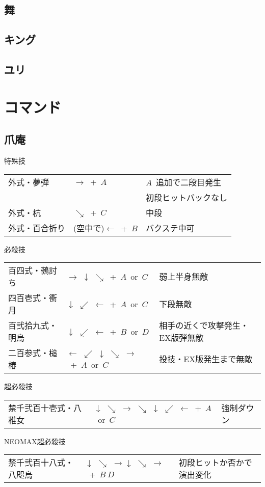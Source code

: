 \documentclass[a4j,11pt]{jarticle}
\def\hado{$\downarrow$ $\searrow$ $\rightarrow$}%
\def\tatsu{$\downarrow$ $\swarrow$ $\leftarrow$}%
\def\syoryu{$\rightarrow$ $\downarrow$ $\searrow$}%
\def\yoga{$\leftarrow$ $\swarrow$ $\downarrow$ $\searrow$ $\rightarrow$}%
\def\ryuko{$\downarrow$ $\searrow$ $\rightarrow$ $\searrow$ $\downarrow$ $\swarrow$ $\leftarrow$}%
\begin{document}
\subsection{舞}
\subsection{キング}
\subsection{ユリ}
\newpage
\section{コマンド}
\subsection{爪庵}
\begin{itembox}[l]{特殊技}
\begin{tabular}{lll}
外式・夢弾&$\rightarrow$\ +\ $A$&$A$\ 追加で二段目発生\\
&&初段ヒットバックなし\\%
外式・杭&$\searrow$\ +\ $C$&中段\\%
外式・百合折り&(空中で)$\leftarrow$\ +\ $B$&バクステ中可%
\end{tabular}
\end{itembox}
\begin{itembox}[l]{必殺技}
\begin{tabular}{lll}
百四式・鵺討ち&\syoryu\ +\ $A$\ or\ $C$&弱上半身無敵\\%
四百壱式・衝月&\tatsu\ +\ $A$\ or\ $C$&下段無敵\\ %
百弐拾九式・明烏&\tatsu\ +\ $B$\ or\ $D$&相手の近くで攻撃発生・EX版弾無敵\\ %
二百参式・槌椿&\yoga\ +\ $A$\ or\ $C$&投技・EX版発生まで無敵%
\end{tabular}
\end{itembox}
\begin{itembox}[l]{超必殺技}
\begin{tabular}{lll}
禁千弐百十壱式・八稚女&\ryuko\ +\ $A$\ or\ $C$&強制ダウン\\ %
\end{tabular}
\end{itembox}
\begin{itembox}[l]{NEOMAX超必殺技}
\begin{tabular}{lll}
禁千弐百十八式・八咫烏&\hado\hado\ +\ $B\ D$&初段ヒットか否かで演出変化%
\end{tabular}
\end{itembox}
\newpage
\end{document}
